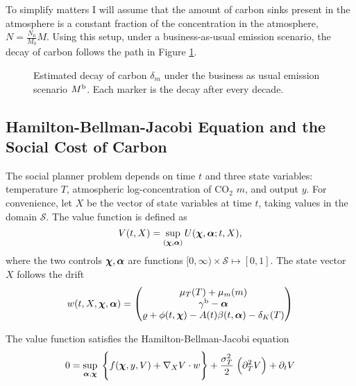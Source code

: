 \documentclass[../../main.tex]{subfiles}
\begin{document}
To simplify matters I will assume that the amount of carbon sinks present in the atmosphere is a constant fraction of the concentration in the atmosphere, $N = \frac{N_0}{M_0} M$. Using this setup, under a business-as-usual emission scenario, the decay of carbon follows the path in Figure \ref{fig:decaypath}.

\begin{figure}[H]
    \centering
    \caption{Estimated decay of carbon $\delta_m$ under the business as usual emission scenario $M^{\mathrm{b}}$. Each marker is the decay after every decade.}
    \label{fig:decaypath}
\end{figure}

\subsection{Hamilton-Bellman-Jacobi Equation and the Social Cost of Carbon}

The social planner problem depends on time $t$ and three state variables: temperature $T$, atmospheric log-concentration of CO$_2$ $m$, and output $y$. For convenience, let $X$ be the vector of state variables at time $t$, taking values in the domain $\mathcal{S}$. The value function is defined as \begin{equation}
    V(t, X) = \sup_{(\bm{\chi}, \bm{\alpha})} U(\bm{\chi}, \bm{\alpha}; t, X),
\end{equation} where the two controls $\bm{\chi}, \bm{\alpha}$ are functions $[0, \infty) \times \mathcal{S} \mapsto [0, 1]$. The state vector $X$ follows the drift \begin{equation}
    w(t, X,  \bm{\chi}, \bm{\alpha}) = \begin{pmatrix}
        \mu_T(T) + \mu_m(m) \\
        \gamma^{\mathrm{b}} - \bm{\alpha} \\
        \varrho + \phi(t, \bm{\chi}) - A(t) \beta(t, \bm{\alpha}) - \delta_K(T)
    \end{pmatrix}
\end{equation}

\begin{proposition}
    The value function satisfies the Hamilton-Bellman-Jacobi equation \begin{equation}
        0 = \sup_{\bm{\alpha}, \bm{\chi}} \; \Bigg\{ f(\bm{\chi}, y, V ) + \nabla_X V \cdot w  \Bigg\} + \frac{\sigma_T^2}{2} \; \Big(\partial^2_T V \Big) + \partial_t V
    \end{equation}
\end{proposition}
\end{document}
